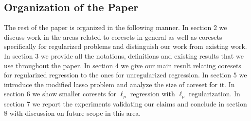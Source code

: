 \subsection{Organization of the Paper}
The rest of the paper is organized in the following manner. In section 2 we discuss work in the areas related to coresets in general as well as coresets specifically for regularized problems and distinguish our work from existing work. In section 3 we provide all the notations, definitions and existing results that we use throughout the paper. In section 4 we give our main result relating coresets for regularized regression to the ones for unregularized regression. In section 5 we introduce the modified lasso  problem and analyze the size of coreset for it. In section 6 we show smaller coresets for $\ell_p$ regression with $\ell_p$ regularization. In section 7 we report the experiments validating our claims and  conclude in section 8 with discussion on future scope in this area.